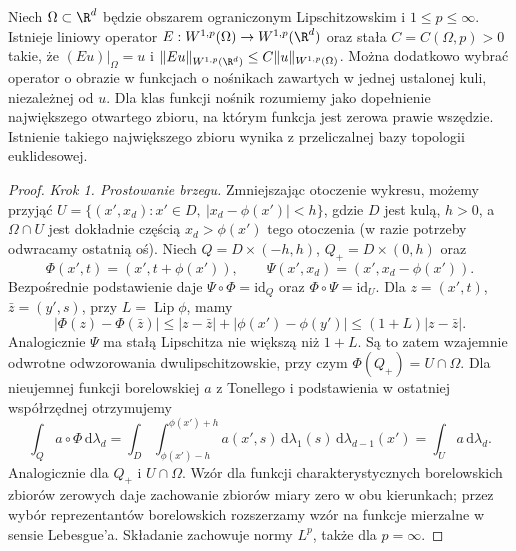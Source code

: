 \begin{lemat}
\label{lem:pde10-extension}
Niech $\Omega\subset\R^d$ będzie obszarem ograniczonym Lipschitzowskim i $1\le p\le\infty$. Istnieje liniowy operator
$E:W^{1,p}(\Omega)\to W^{1,p}(\R^d)$ oraz stała
$C=C(\Omega,p)>0$ takie, że $(Eu)|_\Omega=u$ i
$\|Eu\|_{W^{1,p}(\R^d)}\le C\|u\|_{W^{1,p}(\Omega)}$.
Można dodatkowo wybrać operator o obrazie w funkcjach
o nośnikach zawartych w jednej ustalonej kuli,
niezależnej od $u$. Dla klas funkcji nośnik rozumiemy
jako dopełnienie największego otwartego zbioru,
na którym funkcja jest zerowa prawie wszędzie.
Istnienie takiego największego zbioru wynika
z przeliczalnej bazy topologii euklidesowej.
\end{lemat}
\begin{proof}
\emph{Krok 1. Prostowanie brzegu.}
Zmniejszając otoczenie wykresu, możemy przyjąć
$U=\{(x',x_d):x'\in D,\ |x_d-\phi(x')|<h\}$,
gdzie $D$ jest kulą, $h>0$, a $\Omega\cap U$
jest dokładnie częścią $x_d>\phi(x')$ tego otoczenia
(w razie potrzeby odwracamy ostatnią oś).
Niech $Q=D\times(-h,h)$, $Q_+=D\times(0,h)$ oraz
\[
 \Phi(x',t)=(x',t+\phi(x')), \qquad
 \Psi(x',x_d)=(x',x_d-\phi(x')).
\]
Bezpośrednie podstawienie daje $\Psi\circ\Phi=\mathrm{id}_Q$
oraz $\Phi\circ\Psi=\mathrm{id}_U$. Dla $z=(x',t)$,
$\bar z=(y',s)$, przy $L=\operatorname{Lip}\phi$, mamy
\[
 |\Phi(z)-\Phi(\bar z)|
 \le |z-\bar z|+|\phi(x')-\phi(y')|
 \le(1+L)|z-\bar z|.
\]
Analogicznie $\Psi$ ma stałą Lipschitza nie większą
niż $1+L$. Są to zatem wzajemnie odwrotne odwzorowania
dwulipschitzowskie, przy czym $\Phi(Q_+)=U\cap\Omega$.
Dla nieujemnej funkcji borelowskiej $a$ z Tonellego
i podstawienia w ostatniej współrzędnej otrzymujemy
\[
 \int_Q a\circ\Phi\,\mathrm d\lambda_d
 =\int_D\int_{\phi(x')-h}^{\phi(x')+h}a(x',s)
 \,\mathrm d\lambda_1(s)\,\mathrm d\lambda_{d-1}(x')
 =\int_U a\,\mathrm d\lambda_d.
\]
Analogicznie dla $Q_+$ i $U\cap\Omega$.
Wzór dla funkcji charakterystycznych borelowskich
zbiorów zerowych daje zachowanie zbiorów miary zero
w obu kierunkach; przez wybór reprezentantów borelowskich
rozszerzamy wzór na funkcje mierzalne w sensie Lebesgue'a.
Składanie zachowuje normy $L^p$, także dla $p=\infty$.


\end{proof}
